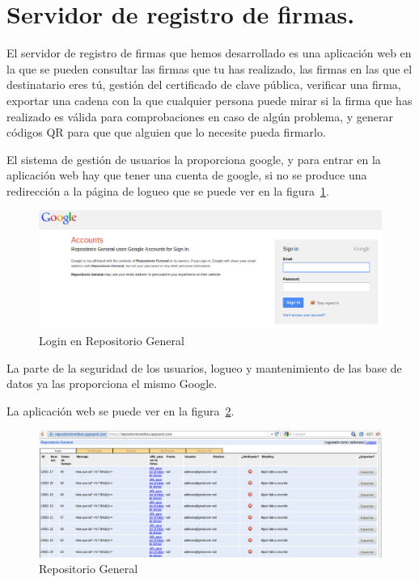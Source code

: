 \section{Servidor de registro de firmas.}
El servidor de registro de firmas que hemos desarrollado es una aplicación web en la que se pueden consultar las firmas que tu has realizado, las firmas en las que el destinatario eres tú, gestión del certificado de clave pública, verificar una firma, exportar una cadena con la que cualquier persona puede mirar si la firma que has realizado es válida para comprobaciones en caso de algún problema, y generar códigos QR para que que alguien que lo necesite pueda firmarlo.

El sistema de gestión de usuarios la proporciona google, y para entrar en la aplicación web hay que tener una cuenta de google, si no se produce una redirección a la página de logueo que se puede ver en la figura~\ref{fig:logueoRepoGeneral}.
\begin{figure}
  \centering
    \includegraphics[scale=0.5]{./GoogleAppEngine/imagenes/login_repositorio_general.png}
  \caption{Login en Repositorio General}
  \label{fig:logueoRepoGeneral}
\end{figure}
La parte de la seguridad de los usuarios, logueo y mantenimiento de las base de datos ya las proporciona el mismo Google.

La aplicación web se puede ver en la figura~\ref{fig:repositorio_general}.
\begin{figure}[gae]
  \centering
    \includegraphics[scale=0.5]{./GoogleAppEngine/imagenes/repositorio_general.png}
  \caption{Repositorio General}
  \label{fig:repositorio_general}
\end{figure}

